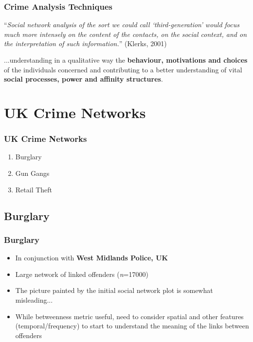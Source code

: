 \documentclass[pdftex]{beamer}
\begin{document}
\begin{frame}
\frametitle{Crime Analysis Techniques}
``{\emph{Social network analysis of the sort we could call ‘third-generation’
would focus much more intensely on the content of the contacts, on the
social context, and on the interpretation of such information.}}''
(Klerks, 2001)\newline\newline

...understanding in a qualitative way the {\textbf{behaviour, motivations and
choices}} of the individuals concerned and contributing to a better
understanding of vital {\textbf{social processes, power and affinity structures}}.
\end{frame}

\section{UK Crime Networks}

\begin{frame}
\frametitle{UK Crime Networks}
{\Large{
\begin{enumerate}
\item Burglary\newline
\item Gun Gangs\newline
\item Retail Theft\newline
\end{enumerate}}}
\end{frame}

\subsection{Burglary}

\begin{frame}
\frametitle{Burglary}
\begin{itemize}
\item In conjunction with {\textbf{West Midlands Police, UK}}
\item Large network of linked offenders ({\emph{n}}=17000)
\item The picture painted by the initial social network plot is
somewhat misleading...
\item While betweenness metric useful, need to consider spatial and other features (temporal/frequency) to
  start to understand the meaning of the links between offenders
\end{itemize}
\end{frame}
\end{document}
